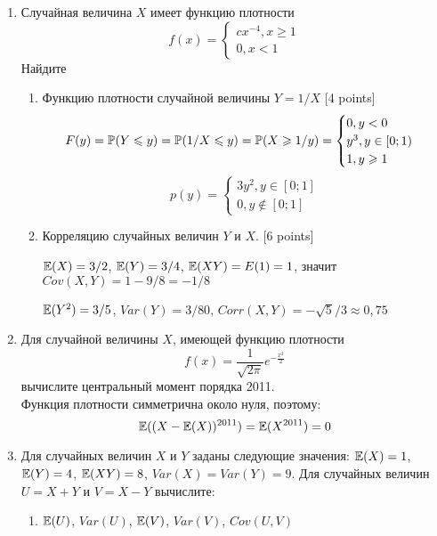 \documentclass[pdftex,12pt,a4paper]{article}
\begin{document}
\begin{enumerate}
\item Случайная величина $X$ имеет функцию плотности
\begin{equation}
f(x)=
\begin{cases}
	cx^{-4}, x\geq 1 \\
	0, x<1
\end{cases}
\end{equation}
Найдите 
\begin{enumerate}
\item  Функцию плотности случайной величины $Y=1/X$ [4 points]
\begin{equation}
F(y)=\P(Y\leq y)=\P(1/X \leq y)=\P(X\geq 1/y)=
\begin{cases}
0, y<0 \\
y^3, y\in [0;1) \\
1, y \geq 1 
\end{cases}
\end{equation}
\begin{equation}
p(y)=
\begin{cases}
3y^2, y\in [0;1]\\
0, y\notin [0;1]
\end{cases}
\end{equation}


\item  Корреляцию случайных величин $Y$ и $X$. [6 points]


$\E(X)=3/2$, $\E(Y)=3/4$, $\E(XY)=E(1)=1$, значит $Cov(X,Y)=1-9/8=-1/8$

$\E(Y^2)=3/5$, $Var(Y)=3/80$, $Corr(X,Y)=-\sqrt{5}/3\approx 0{,}75$
\end{enumerate}

\item Для случайной величины $X$, имеющей функцию плотности 
\begin{equation}
f(x)=\frac{1}{\sqrt{2\pi}}e^{-\frac{x^2}{2}}
\end{equation}
вычислите центральный момент порядка 2011.\\
Функция плотности симметрична около нуля, поэтому:
\begin{equation}
\E((X-\E(X))^{2011})=\E(X^{2011})=0
\end{equation}


\item Для случайных величин $X$ и $Y$ заданы следующие значения: $\E(X)=1$, $\E(Y)=4$, $\E(XY)=8$, $Var(X)=Var(Y)=9$. Для случайных величин $U=X+Y$ и $V=X-Y$ вычислите: 
\begin{enumerate}
\item $\E(U)$, $Var(U)$, $\E(V)$, $Var(V)$, $Cov(U,V)$ \\


\end{enumerate}
\end{enumerate}
\end{document}
